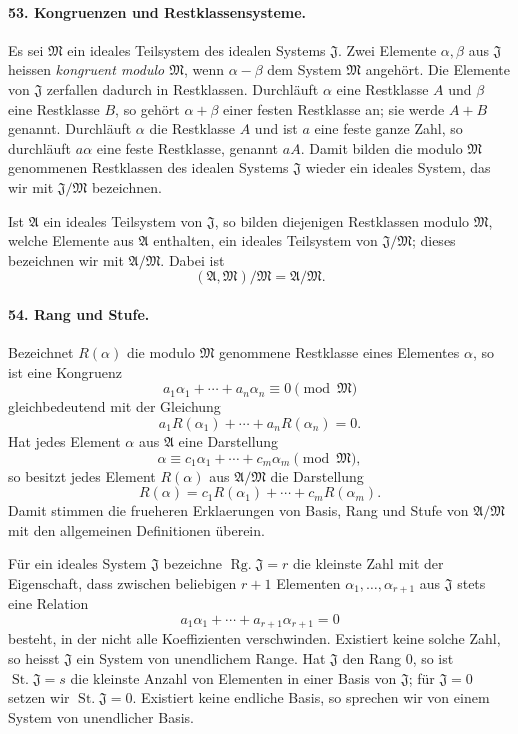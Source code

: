 \documentclass[11pt]{article}
\newcommand{\Rg}{\operatorname{Rg.}}
\newcommand{\St}{\operatorname{St.}}
\begin{document}
\paragraph{53. Kongruenzen und Restklassensysteme.}
Es sei $\mathfrak M$ ein ideales Teilsystem des idealen Systems $\mathfrak J$. Zwei Elemente $\alpha,\beta$ aus $\mathfrak J$ heissen \emph{kongruent modulo $\mathfrak M$}, wenn $\alpha-\beta$ dem System $\mathfrak M$ angehört. Die Elemente von $\mathfrak J$ zerfallen dadurch in Restklassen. Durchläuft $\alpha$ eine Restklasse $A$ und $\beta$ eine Restklasse $B$, so gehört $\alpha+\beta$ einer festen Restklasse an; sie werde $A+B$ genannt. Durchläuft $\alpha$ die Restklasse $A$ und ist $a$ eine feste ganze Zahl, so durchläuft $a\alpha$ eine feste Restklasse, genannt $aA$. Damit bilden die modulo $\mathfrak M$ genommenen Restklassen des idealen Systems $\mathfrak J$ wieder ein ideales System, das wir mit $\mathfrak J/\mathfrak M$ bezeichnen.

Ist $\mathfrak A$ ein ideales Teilsystem von $\mathfrak J$, so bilden diejenigen Restklassen modulo $\mathfrak M$, welche Elemente aus $\mathfrak A$ enthalten, ein ideales Teilsystem von $\mathfrak J/\mathfrak M$; dieses bezeichnen wir mit $\mathfrak A/\mathfrak M$. Dabei ist
\[
  (\mathfrak A,\mathfrak M)/\mathfrak M=\mathfrak A/\mathfrak M.
\]

\paragraph{54. Rang und Stufe.}
Bezeichnet $R(\alpha)$ die modulo $\mathfrak M$ genommene Restklasse eines Elementes $\alpha$, so ist eine Kongruenz
\[
  a_1\alpha_1+\cdots+a_n\alpha_n\equiv0\pmod{\mathfrak M}
\]
gleichbedeutend mit der Gleichung
\[
  a_1R(\alpha_1)+\cdots+a_nR(\alpha_n)=0.
\]
Hat jedes Element $\alpha$ aus $\mathfrak A$ eine Darstellung
\[
  \alpha\equiv c_1\alpha_1+\cdots+c_m\alpha_m\pmod{\mathfrak M},
\]
so besitzt jedes Element $R(\alpha)$ aus $\mathfrak A/\mathfrak M$ die Darstellung
\[
  R(\alpha)=c_1R(\alpha_1)+\cdots+c_mR(\alpha_m).
\]
Damit stimmen die frueheren Erklaerungen von Basis, Rang und Stufe von $\mathfrak A/\mathfrak M$ mit den allgemeinen Definitionen überein.

Für ein ideales System $\mathfrak J$ bezeichne $\Rg\mathfrak J=r$ die kleinste Zahl mit der Eigenschaft, dass zwischen beliebigen $r+1$ Elementen $\alpha_1,
\ldots,\alpha_{r+1}$ aus $\mathfrak J$ stets eine Relation
\[
  a_1\alpha_1+\cdots+a_{r+1}\alpha_{r+1}=0
\]
besteht, in der nicht alle Koeffizienten verschwinden. Existiert keine solche Zahl, so heisst $\mathfrak J$ ein System von unendlichem Range. Hat $\mathfrak J$ den Rang $0$, so ist $\St\mathfrak J=s$ die kleinste Anzahl von Elementen in einer Basis von $\mathfrak J$; für $\mathfrak J=0$ setzen wir $\St\mathfrak J=0$. Existiert keine endliche Basis, so sprechen wir von einem System von unendlicher Basis.
\end{document}

